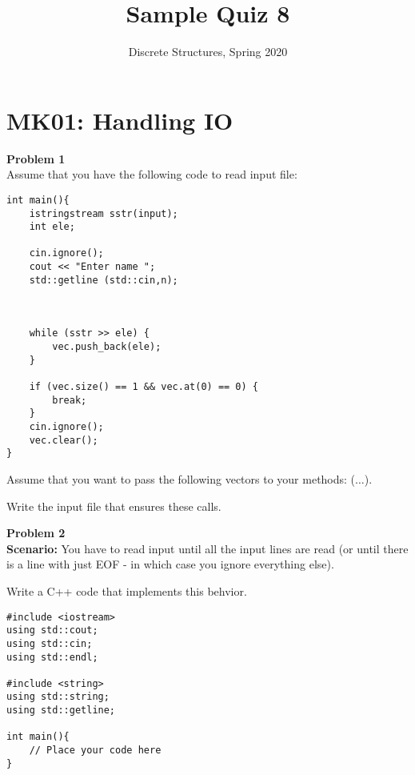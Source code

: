 \documentclass[jou]{apa6}
\title{Sample Quiz 8}
\author{Discrete Structures, Spring 2020}
\affiliation{RBS}
\begin{document}

\twocolumn
\section{MK01: Handling IO}



\vspace{10pt}
{\bf Problem 1}\\
Assume that you have the following code to read input file: 

\begin{verbatim}
int main(){
    istringstream sstr(input);
    int ele;

    cin.ignore();
    cout << "Enter name ";
    std::getline (std::cin,n);



    while (sstr >> ele) {
        vec.push_back(ele);
    }

    if (vec.size() == 1 && vec.at(0) == 0) {
        break;
    }
    cin.ignore();
    vec.clear(); 
}
\end{verbatim}

Assume that you want to pass the following vectors to your methods: ($\ldots$). 

Write the input file that ensures these calls. 


\vspace{10pt}
{\bf Problem 2}\\



{\bf Scenario:} 
You have to read input until all the input lines are read 
(or until there is a line with just EOF - in which case you ignore everything else). 

Write a C++ code that implements this behvior. 

\begin{verbatim}
#include <iostream>
using std::cout;
using std::cin;
using std::endl;

#include <string>
using std::string;
using std::getline;

int main(){
    // Place your code here
}
\end{verbatim}
\end{document}

